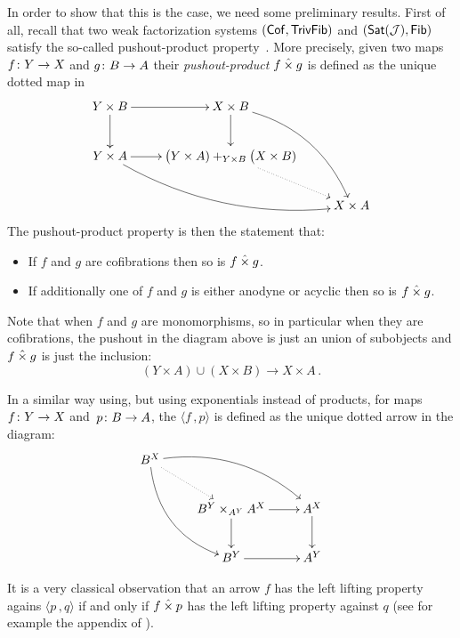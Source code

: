 \documentclass[reqno,10pt,a4paper,oneside,draft]{amsart}
\begin{document}
\medskip

In order to show that this is the case, we need some preliminary results. First of all, recall that
two weak factorization systems $(\mathsf{Cof}, \mathsf{TrivFib})$ and $(\mathsf{Sat}(\mathcal{J}), \mathsf{Fib})$
satisfy the so-called pushout-product property~\cite{henry2018wms}. More precisely, given two maps $f \colon Y \rightarrow X$ and $g \colon B \rightarrow A$ their \emph{pushout-product} $f \mathbin{\hat{\times}} g$ is defined as the unique dotted map in
\[
\xymatrix{
Y \times B \ar[r] \ar[d] &  X \times B \ar[d] \ar@/^1.5pc/[ddr] \\
Y \times A \ar[r]  \ar@/_1.5pc/[drr] & \displaystyle \big( Y \times A ) +_{Y \times B} \big( X \times B ) \ar@{.>}[dr]  \\
 & & X \times A }
 \]
The pushout-product property is then the statement that:

\begin{itemize}
\item If $f$ and $g$ are cofibrations then so is $f \mathbin{\hat{\times}} g$.
\item If additionally one of $f$ and $g$ is either anodyne or acyclic then so is $f \mathbin{\hat{\times}} g$.
\end{itemize}
Note that when $f$ and $g$ are monomorphisms, so in particular when they are cofibrations, the pushout in the diagram above is just an union of subobjects and $f \mathbin{\hat{\times}} g$ is just the inclusion:
\[  
(Y \times A) \cup (X \times B) \rightarrow X \times A \, .
\]






In a similar way using, but using  exponentials instead of products, for maps $f \colon Y \rightarrow X$ and~$p \colon B \rightarrow A$, the   $\langle f \, , p \rangle$ is defined as the unique dotted arrow in the diagram:
\[
\xymatrix{
 B^X \ar@{.>}[dr] \ar@/^1.5pc/[drr] \ar@/_1.5pc/[ddr] \\
& B^Y \times_{A^Y} A^X \ar[r] \ar[d] &  A^X \ar[d]  \\
& B^Y \ar[r] & A^Y  \\
 }
 \]
 
 \medskip
 
It is a very classical observation that an arrow $f$ has the left lifting property agains $\langle p \, , q \rangle$ if and only if $f \mathbin{\hat{\times}} p$ has the left lifting property against $q$ (see for example the appendix of \cite{joyal-tierney-segal}). 

\medskip
\end{document}
